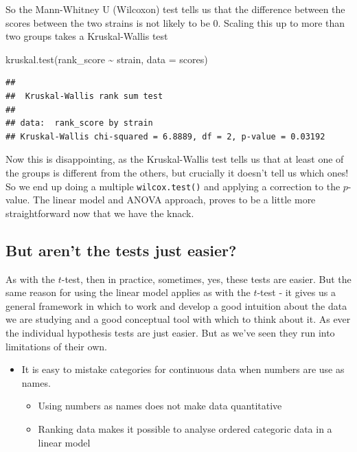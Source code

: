 \documentclass[
]{book}
\newenvironment{Shaded}{\begin{snugshade}}{\end{snugshade}}
\newcommand{\AttributeTok}[1]{\textcolor[rgb]{0.77,0.63,0.00}{#1}}
\newcommand{\FunctionTok}[1]{\textcolor[rgb]{0.00,0.00,0.00}{#1}}
\newcommand{\NormalTok}[1]{#1}
\newcommand{\SpecialCharTok}[1]{\textcolor[rgb]{0.00,0.00,0.00}{#1}}
\providecommand{\tightlist}{%
  \setlength{\itemsep}{0pt}\setlength{\parskip}{0pt}}
\newenvironment{roundup}
{ \begin{tcolorbox}[colbacktitle=yellow!50!white,
title=Round Up,coltitle=black,
fonttitle=\bfseries] }
{  \end{tcolorbox} }
\begin{document}
So the Mann-Whitney U (Wilcoxon) test tells us that the difference between the scores between the two strains is not likely to be 0. Scaling this up to more than two groups takes a Kruskal-Wallis test

\begin{Shaded}
\begin{Highlighting}[]
\FunctionTok{kruskal.test}\NormalTok{(rank\_score }\SpecialCharTok{\textasciitilde{}}\NormalTok{ strain, }\AttributeTok{data =}\NormalTok{ scores)}
\end{Highlighting}
\end{Shaded}

\begin{verbatim}
## 
## 	Kruskal-Wallis rank sum test
## 
## data:  rank_score by strain
## Kruskal-Wallis chi-squared = 6.8889, df = 2, p-value = 0.03192
\end{verbatim}

Now this is disappointing, as the Kruskal-Wallis test tells us that at least one of the groups is different from the others, but crucially it doesn't tell us which ones! So we end up doing a multiple \texttt{wilcox.test()} and applying a correction to the \(p\)-value. The linear model and ANOVA approach, proves to be a little more straightforward now that we have the knack.

\hypertarget{but-arent-the-tests-just-easier}{%
\subsection{But aren't the tests just easier?}\label{but-arent-the-tests-just-easier}}

As with the \(t\)-test, then in practice, sometimes, yes, these tests are easier. But the same reason for using the linear model applies as with the \(t\)-test - it gives us a general framework in which to work and develop a good intuition about the data we are studying and a good conceptual tool with which to think about it. As ever the individual hypothesis tests are just easier. But as we've seen they run into limitations of their own.

\begin{roundup}
\begin{itemize}
\tightlist
\item
  It is easy to mistake categories for continuous data when numbers are use as names.

  \begin{itemize}
  \tightlist
  \item
    Using numbers as names does not make data quantitative
  \item
    Ranking data makes it possible to analyse ordered categoric data in a linear model
  \end{itemize}
\end{itemize}
\end{roundup}
\end{document}
